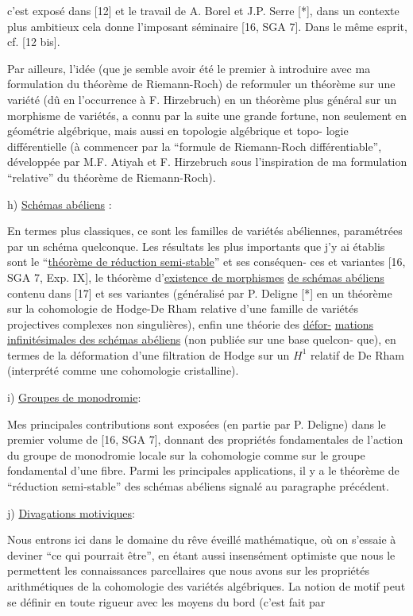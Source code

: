 
c'est exposé dans [12] et le travail de A. Borel et J.P. Serre [*], dans un
contexte plus ambitieux cela donne l'imposant séminaire [16, SGA 7]. Dans le
même esprit, cf. [12 bis].

Par ailleurs, l'idée (que je semble avoir été le premier à introduire
avec ma formulation du théorème de Riemann-Roch) de reformuler un théorème sur
une variété (dû en l'occurrence à F. Hirzebruch) en un théorème plus général
sur un morphisme de variétés, a connu par la suite une grande fortune, non
seulement en géométrie algébrique, mais aussi en topologie algébrique et topo-%
logie différentielle (à commencer par la ``formule de Riemann-Roch différentiable'',
développée par M.F. Atiyah et F. Hirzebruch sous l'inspiration de ma formulation
``relative'' du théorème de Riemann-Roch).

h) \uline{Schémas abéliens} :

En termes plus classiques, ce sont les familles de variétés abéliennes,
paramétrées par un schéma quelconque. Les résultats les plus importants que
j'y ai établis sont le ``\uline{théorème de réduction semi-stable}'' et ses conséquen-%
ces et variantes [16, SGA 7, Exp. IX], le théorème d'\uline{existence de morphismes}
\uline{de schémas abéliens} contenu dans [17] et ses variantes (généralisé par P. Deligne
[*] en un théorème sur la cohomologie de Hodge-De Rham relative d'une famille
de variétés projectives complexes non singulières), enfin une théorie des \uline{défor-}%
\uline{mations infinitésimales des schémas abéliens} (non publiée sur une base quelcon-%
que), en termes de la déformation d'une filtration de Hodge sur un $H^1$ relatif
de De Rham (interprété comme une cohomologie cristalline).

i) \uline{Groupes de monodromie}:

Mes principales contributions sont exposées (en partie par P. Deligne)
dans le premier volume de [16, SGA 7], donnant des propriétés fondamentales de
l'action du groupe de monodromie locale sur la cohomologie comme sur le groupe
fondamental d'une fibre. Parmi les principales applications, il y a le théorème
de ``réduction semi-stable'' des schémas abéliens signalé au paragraphe précédent.

j) \uline{Divagations motiviques}:

Nous entrons ici dans le domaine du rêve éveillé mathématique, où on
s'essaie à deviner ``ce qui pourrait être'', en étant aussi insensément optimiste
que nous le permettent les connaissances parcellaires que nous avons sur les
propriétés arithmétiques de la cohomologie des variétés algébriques. La notion
de motif peut se définir en toute rigueur avec les moyens du bord (c'est fait par

